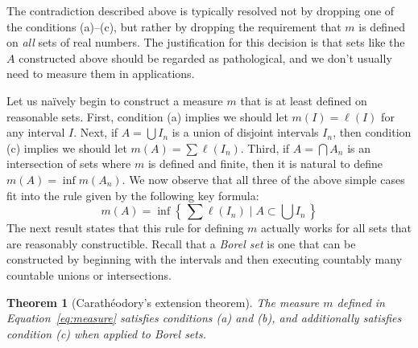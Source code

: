 \documentclass[11pt,oneside]{amsbook}
\newcommand{\set}[1]{\left\{\,#1\,\right\}}
\theoremstyle{definition}
\theoremstyle{plain}
\newtheorem{thm}{Theorem}[section]
\theoremstyle{definition}
\theoremstyle{remark}
\numberwithin{equation}{section}
\numberwithin{figure}{section}
\begin{document}
The contradiction described above is typically resolved not by dropping one of the conditions (a)--(c), but rather by dropping the requirement that $m$ is defined on \emph{all} sets of real numbers. The justification for this decision is that sets like the $A$ constructed above should be regarded as pathological, and we don't usually need to measure them in applications.

Let us na\"ively begin to construct a measure $m$ that is at least defined on reasonable sets. First, condition (a) implies we should let $m(I)=\ell(I)$ for any interval $I$. Next, if $A=\bigcup I_n$ is a union of disjoint intervals $I_n$, then condition (c) implies we should let $m(A)=\sum\ell(I_n)$. Third, if $A=\bigcap A_n$ is an intersection of sets where $m$ is defined and finite, then it is natural to define $m(A)=\inf m(A_n)$. We now observe that all three of the above simple cases fit into the rule given by the following key formula:
\begin{equation}
  \label{eq:measure}
  m(A)=\inf\set{\sum\ell(I_n)\mid A\subset\bigcup I_n}
\end{equation}
The next result states that this rule for defining $m$ actually works for all sets that are reasonably constructible. Recall that a \emph{Borel set} is one that can be constructed by beginning with the intervals and then executing countably many countable unions or intersections.

\begin{thm}[Carath\'eodory's extension theorem]
  \label{thm:caratheodory}
  The measure $m$ defined in Equation~\eqref{eq:measure} satisfies conditions (a) and (b), and additionally satisfies condition (c) when applied to Borel sets.
\end{thm}
\end{document}
